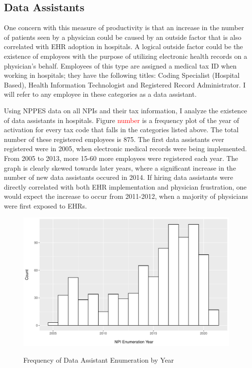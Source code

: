 \documentclass[11pt]{article}
\begin{document}
\subsection{Data Assistants}

One concern with this measure of productivity is that an increase in the number of patients seen by a physician could be caused by an outside factor that is also correlated with EHR adoption in hospitals. A logical outside factor could be the existence of employees with the purpose of utilizing electronic health records on a physician's behalf. Employees of this type are assigned a medical tax ID when working in hospitals; they have the following titles: Coding Specialist (Hospital Based), Health Information Technologist and Registered Record Administrator. I will refer to any employee in these categories as a data assistant. 

Using NPPES data on all NPIs and their tax information, I analyze the existence of data assistants in hospitals. Figure \textcolor{red}{number} is a frequency plot of the year of activation for every tax code that falls in the categories listed above. The total number of these registered employees is 875. The first data assistants ever registered were in 2005, when electronic medical records were being implemented. From 2005 to 2013, more 15-60 more employees were registered each year. The graph is clearly skewed towards later years, where a significant increase in the number of new data assistants occured in 2014. If hiring data assistants were directly correlated with both EHR implementation and physician frustration, one would expect the increase to occur from 2011-2012, when a majority of physicians were first exposed to EHRs. 


\vspace{5mm}
\begin{figure}[ht]
\centering
\caption{Frequency of Data Assistant Enumeration by Year}
\includegraphics[scale=.5]{Objects/dataassistant_histogram.pdf}
    \label{fig:dataassistant_histogram}
\end{figure}
\end{document}
